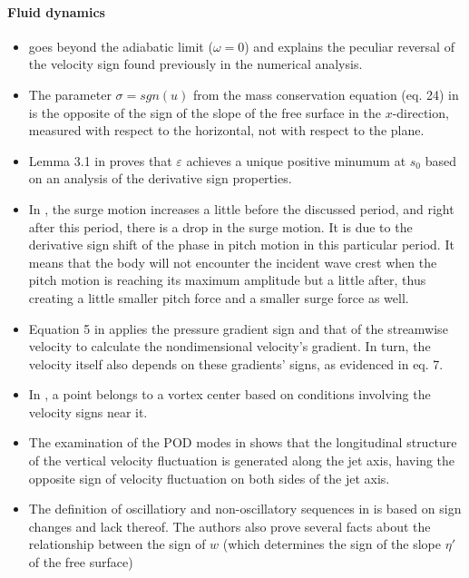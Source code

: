 \documentclass[11pt]{book}
\begin{document}
\paragraph{Fluid dynamics}
\begin{itemize}
\item \cite{fistul2002symmetry}
goes beyond the adiabatic limit ($\omega=0$) and explains the peculiar
reversal of the velocity sign found previously in the numerical analysis.
\item The parameter $\sigma=sgn\left(u\right)$ from the mass conservation
equation (eq. 24) in \cite{perazzo2003thin}
is the opposite of the sign of the slope of the free surface in the
$x$-direction, measured with respect to the horizontal, not with
respect to the plane.
\item Lemma 3.1 in \cite{jerome2009steady}
proves that $\varepsilon$ achieves a unique positive minumum at $s_{0}$
based on an analysis of the derivative sign properties.
\item In \cite{pessoa2010experimental},
the surge motion increases a little before the discussed period, and
right after this period, there is a drop in the surge motion. It is
due to the derivative sign shift of the phase in pitch motion in this
particular period. It means that the body will not encounter the incident
wave crest when the pitch motion is reaching its maximum amplitude
but a little after, thus creating a little smaller pitch force and
a smaller surge force as well.
\item Equation 5 in \cite{duprat2011wall}
applies the pressure gradient sign and that of the streamwise velocity
to calculate the nondimensional velocity's gradient. In turn, the
velocity itself also depends on these gradients' signs, as evidenced
in eq. 7.
\item In \cite{holmen2012methods}, a point belongs
to a vortex center based on conditions involving the velocity signs
near it.
\item The examination of the POD modes in \cite{watanabe2015three}
shows that the longitudinal structure of the vertical velocity fluctuation
is generated along the jet axis, having the opposite sign of velocity
fluctuation on both sides of the jet axis.
\item The definition of oscillatiory and non-oscillatory sequences in \cite{wheeler2015solitary}
is based on sign changes and lack thereof. The authors also prove
several facts about the relationship between the sign of $w$ (which
determines the sign of the slope $\eta'$ of the free surface)

\end{itemize}
\end{document}
